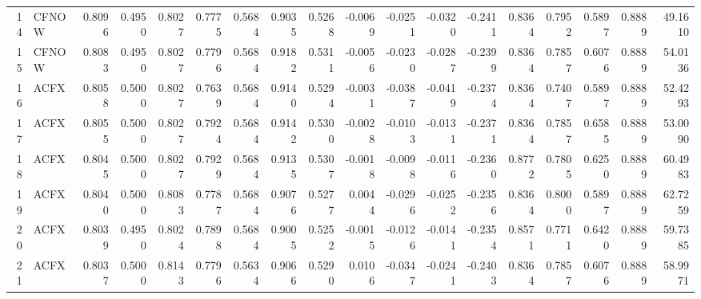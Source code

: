 \begin{tabular}{rlrrrrrrrrrrrrrrrr}
 14 &  CFNOW &          0.8096 &  0.4950 &  0.8027 &   0.7775 &          0.5684 &      0.9035 &             0.5268 &                  -0.0069 &             -0.0251 &                   -0.0320 &                          -0.2411 &          0.8364 &         0.7952 &           0.5897 &            0.8889 &      49.1610 \\
 15 &  CFNOW &          0.8083 &  0.4950 &  0.8027 &   0.7796 &          0.5684 &      0.9182 &             0.5311 &                  -0.0056 &             -0.0230 &                   -0.0287 &                          -0.2399 &          0.8364 &         0.7857 &           0.6076 &            0.8889 &      54.0136 \\
 16 &   ACFX &          0.8058 &  0.5000 &  0.8027 &   0.7639 &          0.5684 &      0.9140 &             0.5294 &                  -0.0031 &             -0.0387 &                   -0.0419 &                          -0.2374 &          0.8364 &         0.7407 &           0.5897 &            0.8889 &      52.4293 \\
 17 &   ACFX &          0.8055 &  0.5000 &  0.8027 &   0.7924 &          0.5684 &      0.9142 &             0.5300 &                  -0.0028 &             -0.0103 &                   -0.0131 &                          -0.2371 &          0.8364 &         0.7857 &           0.6585 &            0.8889 &      53.0090 \\
 18 &   ACFX &          0.8045 &  0.5000 &  0.8027 &   0.7929 &          0.5684 &      0.9135 &             0.5307 &                  -0.0018 &             -0.0098 &                   -0.0116 &                          -0.2360 &          0.8772 &         0.7805 &           0.6250 &            0.8889 &      60.4983 \\
 19 &   ACFX &          0.8040 &  0.5000 &  0.8083 &   0.7787 &          0.5684 &      0.9076 &             0.5277 &                   0.0044 &             -0.0296 &                   -0.0252 &                          -0.2356 &          0.8364 &         0.8000 &           0.5897 &            0.8889 &      62.7259 \\
 20 &   ACFX &          0.8039 &  0.4950 &  0.8024 &   0.7898 &          0.5684 &      0.9005 &             0.5252 &                  -0.0015 &             -0.0126 &                   -0.0141 &                          -0.2354 &          0.8571 &         0.7711 &           0.6420 &            0.8889 &      59.7385 \\
 21 &   ACFX &          0.8037 &  0.5000 &  0.8143 &   0.7796 &          0.5634 &      0.9066 &             0.5290 &                   0.0106 &             -0.0347 &                   -0.0241 &                          -0.2403 &          0.8364 &         0.7857 &           0.6076 &            0.8889 &      58.9971 \\

\end{tabular}
